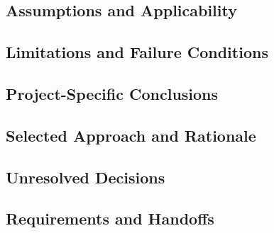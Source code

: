 
\subsection{Assumptions and Applicability}
\label{sec:res-str-sim-assumptions}


\subsection{Limitations and Failure Conditions}
\label{sec:res-str-sim-limitations}


\subsection{Project-Specific Conclusions}
\label{sec:res-str-sim-conclusions}


\subsection{Selected Approach and Rationale}
\label{sec:res-str-sim-selected-approach}


\subsection{Unresolved Decisions}
\label{sec:res-str-sim-unresolved-decisions}


\subsection{Requirements and Handoffs}
\label{sec:res-str-sim-requirements}

